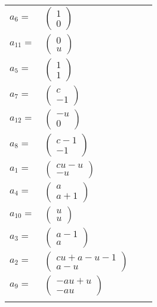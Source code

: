 \documentclass[1p]{elsarticle_modified}
\theoremstyle{definition}
\begin{document}
\begin{tabular}{m{7pt} m{180pt} m{7pt} m{180pt} }
\flushright $a_{6}=$&$\begin{pmatrix}1\\0\end{pmatrix}$ \\
\flushright $a_{11}=$&$\begin{pmatrix}0\\u\end{pmatrix}$ \\
\flushright $a_{5}=$&$\begin{pmatrix}1\\1\end{pmatrix}$ \\
\flushright $a_{7}=$&$\begin{pmatrix}c\\-1\end{pmatrix}$ \\
\flushright $a_{12}=$&$\begin{pmatrix}- u\\0\end{pmatrix}$ \\
\flushright $a_{8}=$&$\begin{pmatrix}c-1\\-1\end{pmatrix}$ \\
\flushright $a_{1}=$&$\begin{pmatrix}c u- u\\- u\end{pmatrix}$ \\
\flushright $a_{4}=$&$\begin{pmatrix}a\\a+1\end{pmatrix}$ \\
\flushright $a_{10}=$&$\begin{pmatrix}u\\u\end{pmatrix}$ \\
\flushright $a_{3}=$&$\begin{pmatrix}a-1\\a\end{pmatrix}$ \\
\flushright $a_{2}=$&$\begin{pmatrix}c u+a- u-1\\a- u\end{pmatrix}$ \\
\flushright $a_{9}=$&$\begin{pmatrix}- a u+u\\- a u\end{pmatrix}$\\&\end{tabular}
\end{document}

